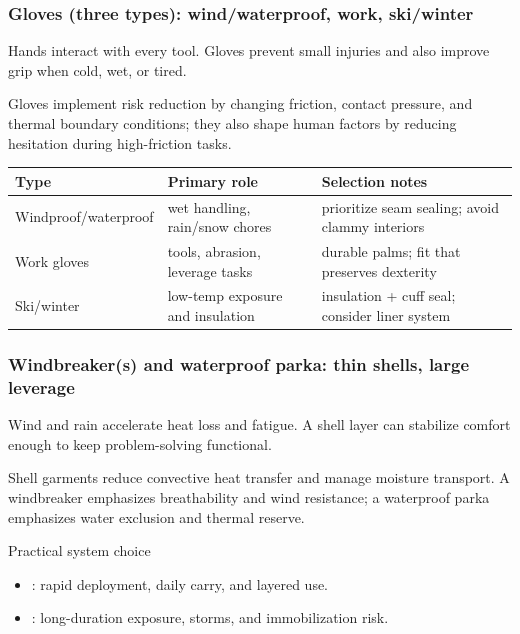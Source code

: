 \begin{frame}[t]
  \frametitle{Gloves (three types): wind/waterproof, work, ski/winter}
  \justifying
   Hands interact with every tool. Gloves prevent small injuries and also improve grip when cold, wet, or tired.

  \vspace{0.5em}
   Gloves implement risk reduction by changing friction, contact pressure, and thermal boundary conditions; they also shape human factors by reducing hesitation during high-friction tasks.

  \vspace{0.8em}
  \TableBodySize
  \begin{table}
    \centering
    \begin{tabularx}{\textwidth}{@{}lX X@{}}
      \toprule
      \textbf{Type} & \textbf{Primary role} & \textbf{Selection notes} \\
      \midrule
      Windproof/waterproof & wet handling, rain/snow chores & prioritize seam sealing; avoid clammy interiors \\
      Work gloves & tools, abrasion, leverage tasks & durable palms; fit that preserves dexterity \\
      Ski/winter & low-temp exposure and insulation & insulation + cuff seal; consider liner system \\
      \bottomrule
    \end{tabularx}
  \end{table}
\end{frame}

\begin{frame}[t]
  \frametitle{Windbreaker(s) and waterproof parka: thin shells, large leverage}
  \justifying
   Wind and rain accelerate heat loss and fatigue. A shell layer can stabilize comfort enough to keep problem-solving functional.

  \vspace{0.5em}
   Shell garments reduce convective heat transfer and manage moisture transport. A windbreaker emphasizes breathability and wind resistance; a waterproof parka emphasizes water exclusion and thermal reserve.

  \vspace{0.8em}
  \begin{block}{Practical system choice}
    \begin{itemize}
      \item {}: rapid deployment, daily carry, and layered use.
      \item {}: long-duration exposure, storms, and immobilization risk.
    \end{itemize}
  \end{block}
\end{frame}

